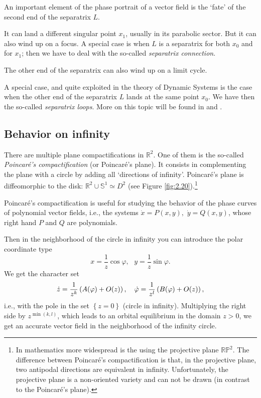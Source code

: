 \begin{remark}
	An important element of the phase portrait of a vector field is the `fate' of the second end of the separatrix $L$.
	
	It can land a different singular point $x_1$, usually in its parabolic sector. But it can also wind up on a focus. A special case is when $L$ is a separatrix for both $x_0$ and for $x_1$; then we have to deal with the so-called \textit{separatrix connection}.
	
	The other end of the separatrix can also wind up on a limit cycle.
	
	A special case, and quite exploited in the theory of  Dynamic Systems is the case when the other end of the separatrix $L$ lands at the same point $x_0$. We have then the so-called \textit{separatrix loops}. More on this topic will be found in \cite{ALG1} and \cite{ALG2}.
\end{remark}

\subsection{Behavior on infinity}

There are multiple plane compactifications in $\mathbb{R}^{2}$. One of them is the so-called \textit{Poincaré's compactification} (or Poincaré's plane). It consists in complementing the plane with a circle by adding all `directions of infinity'. Poincaré's plane is diffeomorphic to the disk: $\mathbb{R}^{2}\cup \mathbb{S}^{1}\simeq D^{2}$ (see Figure \ref{fig:2.20}).\footnote{In mathematics more widespread is the using the projective plane $\mathbb{RP}^{2}$. The difference between Poincaré's compactification is that, in the projective plane, two antipodal directions are equivalent in infinity. Unfortunately, the projective plane is a non-oriented variety and can not be drawn (in contrast to the Poincaré's plane).}

Poincaré's compactification is useful for studying the behavior of the phase curves of polynomial vector fields, i.e., the systems $\dot{x}=P(x,y),$ $\dot{y}=Q(x,y)$, whose right hand $P$ and $Q$ are polynomials.

Then in the neighborhood of the circle in infinity you can introduce the polar coordinate type
$$
x=\frac{1}{z}\cos \varphi ,\text{ \ \ }y=\frac{1}{z}\sin \varphi .
$$
We get the character set
$$
\dot{z}=\frac{1}{z^{k}}\left( A(\varphi )+O(z)\right) ,\text{ \ \ }\dot{%
	\varphi}=\frac{1}{z^{l}}\left( B(\varphi )+O(z)\right) ,
$$
i.e., with the pole in the set $\left\{ z=0\right\} $ (circle in infinity). Multiplying the right side by $z^{\min \left( k,l\right)}$, which leads to an orbital equilibrium in the domain $z>0$, we get an accurate vector field in the neighborhood of the infinity circle.

